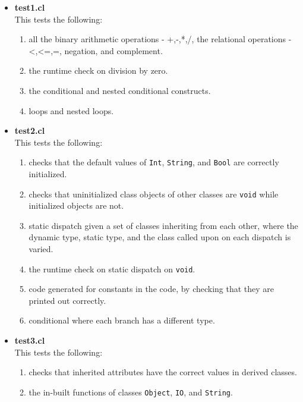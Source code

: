 \documentclass{article}
\begin{document}
\begin{itemize}
	\item \textbf{test1.cl} \\
	This tests the following:
	\begin{enumerate}
		\item all the binary arithmetic operations - +,-,*,/, the relational operations - <,<=,=, negation, and complement. 
		\item the runtime check on division by zero.
		\item the conditional and nested conditional constructs. 
		\item loops and nested loops.
	\end{enumerate}
	\item \textbf{test2.cl} \\
	This tests the following:
	\begin{enumerate}
		\item checks that the default values of \verb|Int|, \verb|String|, and \verb|Bool| are correctly initialized.
		\item checks that uninitialized class objects of other classes are \verb|void| while initialized objects are not.
		\item static dispatch given a set of classes inheriting from each other, where the dynamic type, static type, and the class called upon on each dispatch is varied.
		\item the runtime check on static dispatch on \verb|void|.
		\item code generated for constants in the code, by checking that they are printed out correctly.
		\item conditional where each branch has a different type.
	\end{enumerate}
	\item \textbf{test3.cl} \\
	This tests the following:
	\begin{enumerate}
		\item checks that inherited attributes have the correct values in derived classes.
		\item the in-built functions of classes \verb|Object|, \verb|IO|, and \verb|String|.
	\end{enumerate}
	
\end{itemize}
\end{document}
